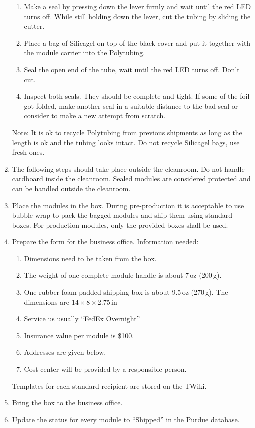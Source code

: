 \documentclass[12pt]{unlsilabsop}
\begin{document}
\begin{enumerate}
\begin{enumerate}
        \item Make a seal by pressing down the lever firmly and wait until the red LED turns off. While still holding down the lever, cut the tubing by sliding the cutter.
        \item Place a bag of Silicagel on top of the black cover and put it together with the module carrier into the Polytubing.
        \item Seal the open end of the tube, wait until the red LED turns off. Don't cut.
        \item Inspect both seals. They should be complete and tight. If some of the foil got folded, make another seal in a suitable distance to the bad seal or consider to make a new attempt from scratch.
    \end{enumerate}
Note: It is ok to recycle Polytubing from previous shipments as long as the length is ok and the tubing looks intact. Do not recycle Silicagel bags, use fresh ones.
    \item The following steps should take place outside the cleanroom. Do not handle cardboard inside the cleanroom. Sealed modules are considered protected and can be handled outside the cleanroom.
    \item Place the modules in the box. During pre-production it is acceptable to use bubble wrap to pack the bagged modules and ship them using standard boxes. For production modules, only the provided boxes shall be used.
    \item Prepare the form for the business office. Information needed:
    \begin{enumerate}
        \item Dimensions need to be taken from the box.
        \item The weight of one complete module handle is about 7\,oz (200\,g).
        \item One rubber-foam padded shipping box is about 9.5\,oz (270\,g). The dimensions are 14\,$\times$\,8\,$\times$\,2.75\,in
        \item Service us usually ``FedEx Overnight''
        \item Insurance value per module is \$100.
        \item Addresses are given below.
        \item Cost center will be provided by a responsible person.
    \end{enumerate}
    Templates for each standard recipient are stored on the TWiki.
    \item Bring the box to the business office. 
    \item Update the status for every module to ``Shipped'' in the Purdue database.
\end{enumerate}
\end{document}
